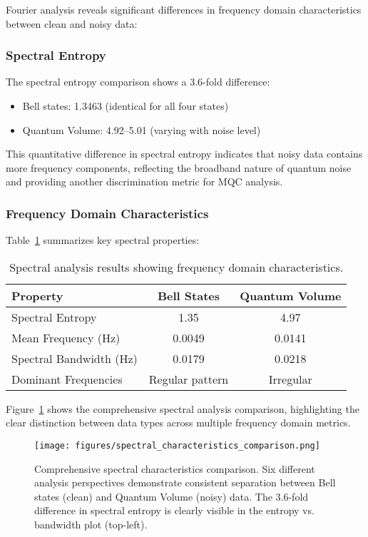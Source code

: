 Fourier analysis reveals significant differences in frequency domain characteristics between clean and noisy data:

\subsubsection{Spectral Entropy}
The spectral entropy comparison shows a 3.6-fold difference:
\begin{itemize}
\item Bell states: 1.3463 (identical for all four states)
\item Quantum Volume: 4.92--5.01 (varying with noise level)
\end{itemize}

This quantitative difference in spectral entropy indicates that noisy data contains more frequency components, reflecting the broadband nature of quantum noise and providing another discrimination metric for MQC analysis.

\subsubsection{Frequency Domain Characteristics}
Table~\ref{tab:spectral_analysis} summarizes key spectral properties:

\begin{table}[htb]
\centering
\caption{Spectral analysis results showing frequency domain characteristics.}
\label{tab:spectral_analysis}
\begin{tabular}{lcc}
\hline\hline
Property & Bell States & Quantum Volume \\
\hline
Spectral Entropy & 1.35 & 4.97 \\
Mean Frequency (Hz) & 0.0049 & 0.0141 \\
Spectral Bandwidth (Hz) & 0.0179 & 0.0218 \\
Dominant Frequencies & Regular pattern & Irregular \\
\hline\hline
\end{tabular}
\end{table}

Figure~\ref{fig:spectral_comparison} shows the comprehensive spectral analysis comparison, highlighting the clear distinction between data types across multiple frequency domain metrics.

\begin{figure}[htb]
\centering
\texttt{[image: figures/spectral\_characteristics\_comparison.png]}
\caption{Comprehensive spectral characteristics comparison. Six different analysis perspectives demonstrate consistent separation between Bell states (clean) and Quantum Volume (noisy) data. The 3.6-fold difference in spectral entropy is clearly visible in the entropy vs. bandwidth plot (top-left).}
\label{fig:spectral_comparison}
\end{figure}


